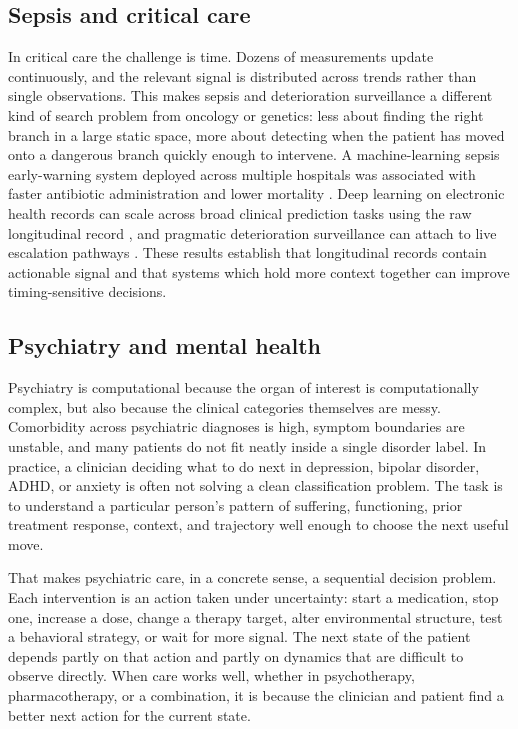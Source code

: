 \documentclass[11pt]{article}
\begin{document}
\subsection{Sepsis and critical care}
In critical care the challenge is time. Dozens of measurements update continuously, and the relevant signal is distributed across trends rather than single observations. This makes sepsis and deterioration surveillance a different kind of search problem from oncology or genetics: less about finding the right branch in a large static space, more about detecting when the patient has moved onto a dangerous branch quickly enough to intervene. A machine-learning sepsis early-warning system deployed across multiple hospitals was associated with faster antibiotic administration and lower mortality \citep{adams2022}. Deep learning on electronic health records can scale across broad clinical prediction tasks using the raw longitudinal record \citep{rajkomar2018}, and pragmatic deterioration surveillance can attach to live escalation pathways \citep{moses2025}. These results establish that longitudinal records contain actionable signal and that systems which hold more context together can improve timing-sensitive decisions.

\subsection{Psychiatry and mental health}
Psychiatry is computational because the organ of interest is computationally complex, but also because the clinical categories themselves are messy. Comorbidity across psychiatric diagnoses is high, symptom boundaries are unstable, and many patients do not fit neatly inside a single disorder label. In practice, a clinician deciding what to do next in depression, bipolar disorder, ADHD, or anxiety is often not solving a clean classification problem. The task is to understand a particular person's pattern of suffering, functioning, prior treatment response, context, and trajectory well enough to choose the next useful move.

That makes psychiatric care, in a concrete sense, a sequential decision problem. Each intervention is an action taken under uncertainty: start a medication, stop one, increase a dose, change a therapy target, alter environmental structure, test a behavioral strategy, or wait for more signal. The next state of the patient depends partly on that action and partly on dynamics that are difficult to observe directly. When care works well, whether in psychotherapy, pharmacotherapy, or a combination, it is because the clinician and patient find a better next action for the current state.
\end{document}
